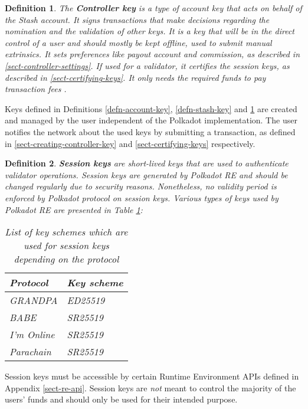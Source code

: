 \documentclass{book}
\newcommand{\tmem}[1]{{\em #1\/}}
\newcommand{\tmstrong}[1]{\textbf{#1}}
\newcommand{\tmtextbf}[1]{{\bfseries{#1}}}
\newcommand{\tmtextit}[1]{{\itshape{#1}}}
\newtheorem{definition}{Definition}
\providecommand{\tmem}[1]{\tmtextit{#1}}
\providecommand{\tmstrong}[1]{\tmtextbf{#1}}
\providecommand{\tmtextbf}[1]{\tmtextbf{#1}}
\providecommand{\tmtextit}[1]{\tmtextit{#1}}
\newtheorem{definition}{Definition}
\begin{document}
\begin{definition}
  \label{defn-controller-key}The {\tmstrong{Controller key}} is a type of
  account key that acts on behalf of the Stash account. It signs transactions
  that make decisions regarding the nomination and the validation of other
  keys. It is a key that will be in the direct control of a user and should
  mostly be kept offline, used to submit manual extrinsics. It sets
  preferences like payout account and commission, as described in
  \ref{sect-controller-settings}. If used for a validator, it certifies the
  session keys, as described in \ref{sect-certifying-keys}. It only needs the
  required funds to pay transaction fees {}.
\end{definition}

Keys defined in Definitions \ref{defn-account-key}, \ref{defn-stash-key} and
\ref{defn-controller-key} are created and managed by the user independent of
the Polkadot implementation. The user notifies the network about the used keys
by submitting a transaction, as defined in \ref{sect-creating-controller-key}
and \ref{sect-certifying-keys} respectively.

\begin{definition}
  \label{defn-session-key}{\tmstrong{Session keys}} are short-lived keys that
  are used to authenticate validator operations. Session keys are generated by
  Polkadot RE and should be changed regularly due to security reasons.
  Nonetheless, no validity period is enforced by Polkadot protocol on session
  keys. Various types of keys used by Polkadot RE are presented in Table
  \ref{tabl-session-keys}{\tmem{:}}
  
  \begin{table}[h]
    \begin{tabular}{ll}
      \hline
      Protocol & Key scheme\\
      \hline
      GRANDPA & ED25519\\
      BABE & SR25519\\
      I'm Online & SR25519\\
      Parachain & SR25519\\
      \hline
    \end{tabular}
    \caption{\label{tabl-session-keys}List of key schemes which are used for
    session keys depending on the protocol}
  \end{table}
\end{definition}

Session keys must be accessible by certain Runtime Environment APIs defined in
Appendix \ref{sect-re-api}. Session keys are {\tmem{not}} meant to control the
majority of the users' funds and should only be used for their intended
purpose. {}
\end{document}
